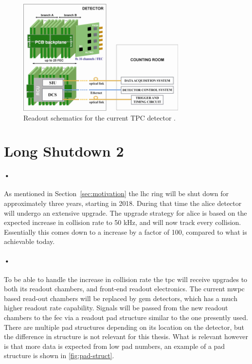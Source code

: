 \documentclass[a4paper, 12pt]{report}
\begin{document}
\begin{figure}[h!]
  \centering
    \includegraphics[width=0.75\textwidth]{images/altro.png}
     \caption[Readout schematics for the current TPC detector]{Readout schematics for the current TPC detector \cite{tdr-016}.}
    \label{fig:altro}
\end{figure}

\section{Long Shutdown 2}
\paragraph{•}
As mentioned in Section~\ref{sec:motivation} the \gls{lhc} ring will be shut down for approximately three years, starting in 2018.
During that time the \gls{alice} detector will undergo an extensive upgrade.
The upgrade strategy for \gls{alice} is based on the expected increase in collision rate to 50 kHz, and will now track every collision.
Essentially this comes down to a increase by a factor of 100, compared to what is achievable today.

\paragraph{•} 
To be able to handle the increase in collision rate the \gls{tpc} will receive upgrades to both its readout chambers, and front-end readout electronics.
The current \gls{mwpc} based read-out chambers will be replaced by \gls{gem} detectors, which has a much higher readout rate capability.
Signals will be passed from the new readout chambers to the \gls{fec} via a readout pad structure similar to the one presently used.
There are multiple pad structures depending on its location on the detector, but the difference in structure is not relevant for this thesis.
What is relevant however is that more data is expected from low pad numbers, an example of a pad structure is shown in \ref{fig:pad-struct}.
\end{document}
